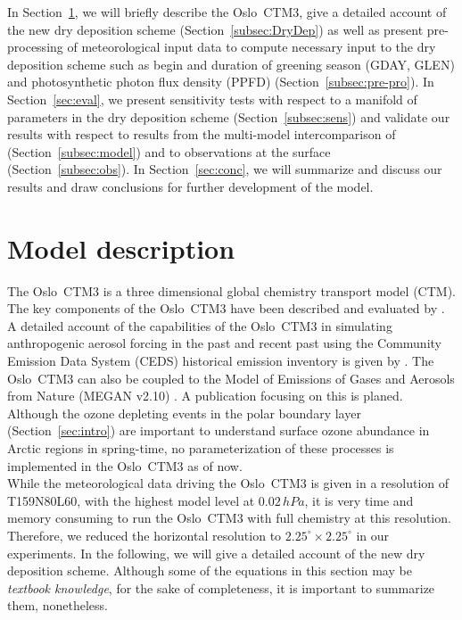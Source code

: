 \documentclass[gmd, manuscript]{copernicus}
\begin{document}
In Section~\ref{sec:model_des}, we will briefly describe the Oslo~CTM3, give a detailed account of the new dry deposition scheme (Section~\ref{subsec:DryDep}) as well as present pre-processing of meteorological input data to compute necessary input to the dry deposition scheme such as begin and duration of greening season (GDAY, GLEN) and photosynthetic photon flux density (PPFD) (Section~\ref{subsec:pre-pro}). In Section~\ref{sec:eval}, we present sensitivity tests with respect to a manifold of parameters in the dry deposition scheme (Section~\ref{subsec:sens}) and validate our results with respect to results from the multi-model intercomparison of \citet{ACP:Hardacre2015} (Section~\ref{subsec:model}) and to observations at the surface (Section~\ref{subsec:obs}). In Section~\ref{sec:conc}, we will summarize and discuss our results and draw conclusions for further development of the model.
\section{Model description}
\label{sec:model_des}
The Oslo~CTM3 is a three dimensional global chemistry transport model (CTM). The key components of the Oslo~CTM3 have been described and evaluated by \citet{GMD:Sovde2012}. A detailed account of the capabilities of the Oslo~CTM3 in simulating anthropogenic aerosol forcing in the past and recent past using the Community Emission Data System (CEDS) historical emission inventory \citep{GMD:Hoesly2018} is given by \citet{GMD:Lund2018}. The Oslo~CTM3 can also be coupled to the Model of Emissions of Gases and Aerosols from Nature (MEGAN v2.10) \citep{ACP:Guenther2006}. A publication focusing on this is planed. Although the ozone depleting events in the polar boundary layer (Section~\ref{sec:intro}) are important to understand surface ozone abundance in Arctic regions in spring-time, no parameterization of these processes is implemented in the Oslo~CTM3 as of now.\\
While the meteorological data driving the Oslo~CTM3 is given in a resolution of T159N80L60, with the highest model level at $0.02\,\unit{hPa}$, it is very time and memory consuming to run the Oslo~CTM3 with full chemistry at this resolution. Therefore, we reduced the horizontal resolution to $2.25^\circ\times2.25^\circ$ in our experiments. In the following, we will give a detailed account of the new dry deposition scheme. Although some of the equations in this section may be \emph{textbook knowledge}, for the sake of completeness, it is important to summarize them, nonetheless.
\end{document}
